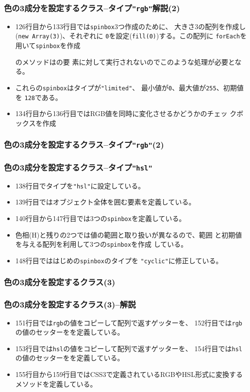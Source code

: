  \begin{frame}[containsverbatim]
  \frametitle{色の3成分を設定するクラス--タイプ\texttt{"rgb"}解説(2)}
			 \begin{itemize}
			  \item 126行目から133行目では\texttt{spinbox}3つ作成のために、
							大きさ3の配列を作成し(\texttt{new Array(3)})、それぞれに
							\texttt{0}を設定(\texttt{fill(0)})する。この配列に
							\texttt{forEach}を用いて\texttt{spinbox}を作成

							のメソッドはの要
							素に対して実行されないのでこのような処理が必要となる。
				\item これらの\texttt{spinbox}はタイプが\texttt{"limited"}、
							最小値が\texttt{0}、最大値が\texttt{255}、初期値を
							\texttt{128}である。
				\item 134行目から136行目ではRGB値を同時に変化させるかどうかのチェッ
							クボックスを作成
			 \end{itemize}
 \end{frame}
 \begin{frame}[containsverbatim]
  \frametitle{色の3成分を設定するクラス--タイプ\texttt{"rgb"}(2)}
\end{frame}
 \begin{frame}[containsverbatim]
  \frametitle{色の3成分を設定するクラス--タイプ\texttt{"hsl"}}
			 \begin{itemize}
				\item 138行目でタイプを\texttt{"hsl"}に設定している。
				\item 139行目ではオブジェクト全体を囲む要素を定義している。
				\item 140行目から147行目では3つの\texttt{spinbox}を定義している。
				\item 色相(H)と残りの2つでは値の範囲と取り扱いが異なるので、範囲
							と初期値を与える配列を利用して3つの\texttt{spinbox}を作成
							している。
				\item 148行目でははじめの\texttt{spinbox}のタイプを
							\texttt{"cyclic"}に修正している。
			 \end{itemize}
 \end{frame}
 \begin{frame}[containsverbatim]
  \frametitle{色の3成分を設定するクラス(3)}
\end{frame}
 \begin{frame}[containsverbatim]
  \frametitle{色の3成分を設定するクラス(3)--解説}
  \begin{itemize}
 \item 151行目では\texttt{rgb}の値をコピーして配列で返すゲッターを、
 152行目では\texttt{rgb}の値のセッターをを定義している。
 \item 153行目では\texttt{hsl}の値をコピーして配列で返すゲッターを、
 154行目では\texttt{hsl}の値のセッターをを定義している。
 \item 155行目から159行目ではCSS3で定義されているRGBやHSL形式に変換する
			 メソッドを定義している。
\end{itemize}
 \end{frame}

